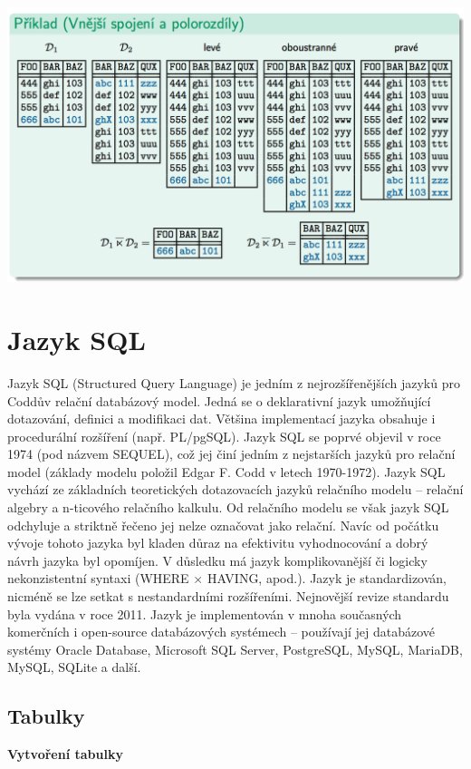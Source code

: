 \documentclass[10pt,a4paper]{article}
\begin{document}
	\includegraphics[scale=0.4]{img/59}

\newpage	
\section{Jazyk SQL}
Jazyk SQL  (Structured Query Language) je jedním z nejrozšířenějších jazyků pro Coddův relační databázový model. Jedná se o deklarativní jazyk umožňující dotazování, definici a modifikaci dat. Většina implementací jazyka obsahuje i procedurální rozšíření (např. PL/pgSQL). Jazyk SQL se poprvé objevil v roce 1974 (pod názvem SEQUEL), což jej činí jedním z nejstarších jazyků pro relační model (základy modelu položil Edgar F. Codd v letech 1970-1972).
Jazyk SQL vychází ze základních teoretických dotazovacích jazyků relačního modelu – relační algebry a n-ticového relačního kalkulu. Od relačního modelu se však jazyk SQL odchyluje a striktně řečeno jej nelze označovat jako relační. Navíc od počátku vývoje tohoto jazyka byl kladen důraz na efektivitu vyhodnocování a dobrý návrh jazyka byl opomíjen. V důsledku má jazyk komplikovanější či logicky nekonzistentní syntaxi (WHERE $\times$ HAVING, apod.).
Jazyk je standardizován, nicméně se lze setkat s nestandardními rozšířeními. Nejnovější revize standardu byla vydána v roce 2011. Jazyk je implementován v mnoha současných komerčních i open-source databázových systémech – používají jej databázové systémy Oracle Database, Microsoft SQL Server, PostgreSQL, MySQL, MariaDB, MySQL, SQLite a další.
 \subsection{Tabulky}
\noindent\textbf{Vytvoření tabulky}
\end{document}
